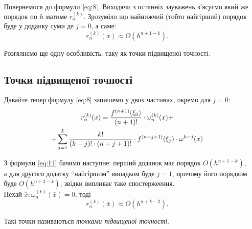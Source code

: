 Повернемося до формули \eqref{eq:8}. Виходячи з останніх зауважень з'ясуємо який же порядок по $h$ матиме $r_n^{(k)}$. Зрозуміло що найнижчий (тобто найгірший) порядок буде у доданку суми де $j = 0$, а саме:
\begin{equation}
	\label{eq:10}
	r_n^{(k)}(x) \approx O(h^{n + 1 - k}).
\end{equation}

Розгялнемо ще одну особливість, таку як точки підвищеної точності.

\subsection{Точки підвищеної точності}

Давайте тепер формулу \eqref{eq:8} запишемо у двох частинах, окремо для $j = 0$:
\begin{multline}
	\label{eq:11}
	r_n^{(k)}(x) = \frac{f^{(n + 1)}(\xi_0)}{(n + 1)!} \cdot \omega_n^{(k)}(x) + \\ + \displaystyle\sum\limits_{j = 1}^k \frac{k!}{(k-j)! \cdot (n+j+1)!} \cdot f^{(n + j + 1)}(\xi_j) \cdot \omega^{k - j}(x)
\end{multline}

З формули \eqref{eq:11} бачимо наступне: перший доданок має порядок $O(h^{n + 1 - k})$, а для другого додатку ``найгіршим'' випадком буде $j = 1$, причому його порядком буде $O(h^{n + 2 - k})$, звідки випливає таке спостержеення. \\

Нехай $\bar x: \omega_n^{(k)}(\bar x) = 0$, тоді 
\begin{equation}
	\label{eq:12}
	r_n^{(k)}(\bar x) \approx O({h^{n + k - 2}}).
\end{equation}

Такі точки називаються \textit{точками підвищеної точності}.


